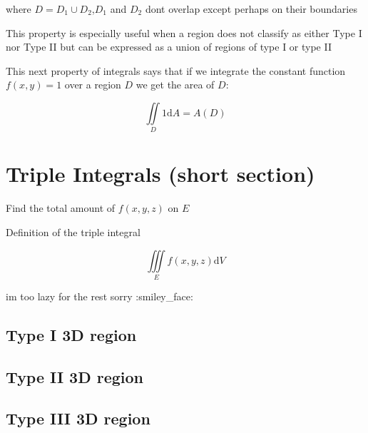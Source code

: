 \documentclass{article}
\begin{document}
where $D = D_1 \cup D_2 $,$D_1$ and $D_2$ dont overlap except perhaps on their boundaries

This property is especially useful when a region does not classify as either Type I nor Type II but can be expressed as a union of regions of type I or type II

This next property of integrals says that if we integrate the constant function $f(x,y) = 1$ over a region $D$ we get the area of $D$:

$$\iint\limits_{D}1\mathrm{d}A = A(D)$$

\newpage

\section{Triple Integrals (short section)}

    Find the total amount of $f(x,y,z)$ on $E$

    Definition of the triple integral

    $$\iiint\limits_{E}f(x,y,z)\mathrm{d}V$$

    im too lazy for the rest sorry :smiley\_face:

    \subsection{Type I 3D region}

    \subsection{Type II 3D region}

    \subsection{Type III 3D region}

\newpage
\end{document}
